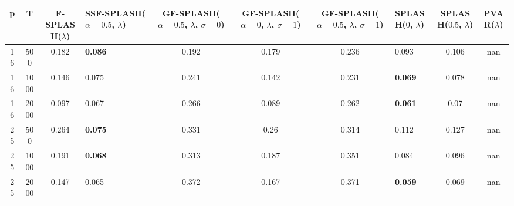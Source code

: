 \begin{tabular}{ccclccclcc}
\hline
  p  &  T   &  F-SPLASH($\lambda$)  & SSF-SPLASH($\alpha=0.5$, $\lambda$)   &  GF-SPLASH($\alpha=0.5$, $\lambda$, $\sigma=0$)  &  GF-SPLASH($\alpha=0$, $\lambda$, $\sigma=1$)  &  GF-SPLASH($\alpha=0.5$, $\lambda$, $\sigma=1$)  & SPLASH($0$, $\lambda$)   &  SPLASH($0.5$, $\lambda$)  &  PVAR($\lambda$)  \\
\hline
 16  & 500  &         0.182         & \textbf{0.086}                        &                      0.192                       &                     0.179                      &                      0.236                       & 0.093                    &           0.106            &        nan        \\
 16  & 1000 &         0.146         & 0.075                                 &                      0.241                       &                     0.142                      &                      0.231                       & \textbf{0.069}           &           0.078            &        nan        \\
 16  & 2000 &         0.097         & 0.067                                 &                      0.266                       &                     0.089                      &                      0.262                       & \textbf{0.061}           &            0.07            &        nan        \\
 25  & 500  &         0.264         & \textbf{0.075}                        &                      0.331                       &                      0.26                      &                      0.314                       & 0.112                    &           0.127            &        nan        \\
 25  & 1000 &         0.191         & \textbf{0.068}                        &                      0.313                       &                     0.187                      &                      0.351                       & 0.084                    &           0.096            &        nan        \\
 25  & 2000 &         0.147         & 0.065                                 &                      0.372                       &                     0.167                      &                      0.371                       & \textbf{0.059}           &           0.069            &        nan        \\
\hline
\end{tabular}